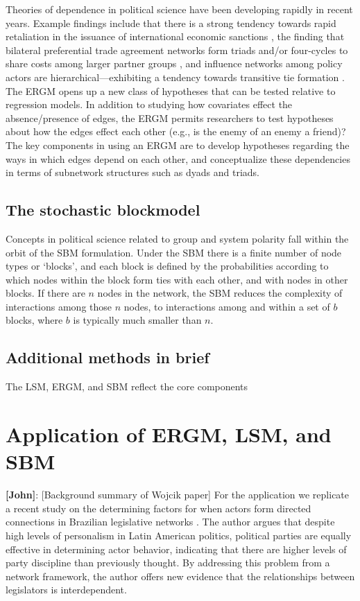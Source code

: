 \documentclass[fleqn,12pt]{wlscirep}
\begin{document}
Theories of dependence in political science have been developing rapidly in recent years. Example findings include that there is a strong tendency towards rapid retaliation in the issuance of international economic sanctions \citep{cranmer2014reciprocity}, the finding that bilateral preferential trade agreement networks form triads and/or four-cycles to share costs among larger partner groups \citep{milewicz2018beyond}, and influence networks among policy actors are hierarchical---exhibiting a tendency towards transitive tie formation \citep{christopoulos2015exceptional}.  The ERGM opens up a new class of hypotheses that can be tested relative to regression models. In addition to studying how covariates effect the absence/presence of edges, the ERGM permits researchers to test hypotheses about how the edges effect each other (e.g., is the enemy of an enemy a friend)? The key components in using an ERGM are to develop hypotheses regarding the ways in which edges depend on each other, and conceptualize these dependencies in terms of subnetwork structures such as dyads and triads.


\subsection{The stochastic blockmodel}

Concepts in political science related to group  and system polarity \citep[e.g., ][]{baldassarri2007dynamics,cranmer2015kantian} fall within the orbit of the SBM formulation. Under the SBM there is a finite number of node types or `blocks', and each block is defined by the probabilities according to which nodes within the block form ties with each other, and with nodes in other blocks. If there are $n$ nodes in the network, the SBM reduces the complexity of interactions among those $n$  nodes, to interactions among and within a set of $b$ blocks, where $b$ is typically much smaller than $n$. 

\subsection{Additional methods in brief}

The LSM, ERGM, and SBM reflect the core components

\section{Application of ERGM, LSM, and SBM}

{\bf [John]}: [Background summary of Wojcik paper] For the application we replicate a recent study on the determining factors for when actors form directed connections in Brazilian legislative networks \citep{wojcik2017legislative}. The author argues that despite high levels of personalism in Latin American politics, political parties are equally effective in determining actor behavior, indicating that there are higher levels of party discipline than previously thought. By addressing this problem from a network framework, the author offers new evidence that the relationships between legislators is interdependent.\\
\end{document}
